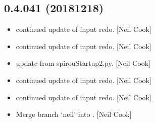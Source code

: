 \documentclass[a4paper,10pt,english]{report}
\begin{document}
\subsection{0.4.041 (2018\sphinxhyphen{}12\sphinxhyphen{}18)}
\label{\detokenize{misc/changelog:id246}}\begin{itemize}
\item {} 
 \sphinxhyphen{} continued update of input redo. {[}Neil Cook{]}

\item {} 
 \sphinxhyphen{} continued update of input redo. {[}Neil Cook{]}

\item {} 
 \sphinxhyphen{} update from spirouStartup2.py. {[}Neil Cook{]}

\item {} 
 \sphinxhyphen{} continued update of input redo. {[}Neil Cook{]}

\item {} 
 \sphinxhyphen{} continued update of input redo. {[}Neil Cook{]}

\item {} 
Merge branch ‘neil’ into . {[}Neil Cook{]}

\end{itemize}
\end{document}

